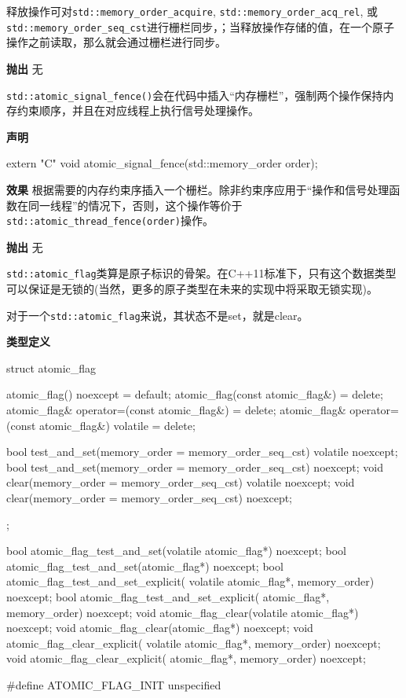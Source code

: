释放操作可对\texttt{std::memory\_order\_acquire}, \texttt{std::memory\_order\_acq\_rel}, 或 \texttt{std::memory\_order\_seq\_cst}进行栅栏同步，；当释放操作存储的值，在一个原子操作之前读取，那么就会通过栅栏进行同步。

\textbf{抛出}
无


\texttt{std::atomic\_signal\_fence()}会在代码中插入“内存栅栏”，强制两个操作保持内存约束顺序，并且在对应线程上执行信号处理操作。

\textbf{声明}

\begin{cpp}
extern "C" void atomic_signal_fence(std::memory_order order);
\end{cpp}

\textbf{效果}
根据需要的内存约束序插入一个栅栏。除非约束序应用于“操作和信号处理函数在同一线程”的情况下，否则，这个操作等价于\texttt{std::atomic\_thread\_fence(order)}操作。

\textbf{抛出}
无


\texttt{std::atomic\_flag}类算是原子标识的骨架。在C++11标准下，只有这个数据类型可以保证是无锁的(当然，更多的原子类型在未来的实现中将采取无锁实现)。

对于一个\texttt{std::atomic\_flag}来说，其状态不是set，就是clear。

\textbf{类型定义}

\begin{cpp}
struct atomic_flag
{
  atomic_flag() noexcept = default;
  atomic_flag(const atomic_flag&) = delete;
  atomic_flag& operator=(const atomic_flag&) = delete;
  atomic_flag& operator=(const atomic_flag&) volatile = delete;

  bool test_and_set(memory_order = memory_order_seq_cst) volatile
    noexcept;
  bool test_and_set(memory_order = memory_order_seq_cst) noexcept;
  void clear(memory_order = memory_order_seq_cst) volatile noexcept;
  void clear(memory_order = memory_order_seq_cst) noexcept;
};

bool atomic_flag_test_and_set(volatile atomic_flag*) noexcept;
bool atomic_flag_test_and_set(atomic_flag*) noexcept;
bool atomic_flag_test_and_set_explicit(
  volatile atomic_flag*, memory_order) noexcept;
bool atomic_flag_test_and_set_explicit(
  atomic_flag*, memory_order) noexcept;
void atomic_flag_clear(volatile atomic_flag*) noexcept;
void atomic_flag_clear(atomic_flag*) noexcept;
void atomic_flag_clear_explicit(
  volatile atomic_flag*, memory_order) noexcept;
void atomic_flag_clear_explicit(
  atomic_flag*, memory_order) noexcept;

#define ATOMIC_FLAG_INIT unspecified
\end{cpp}

